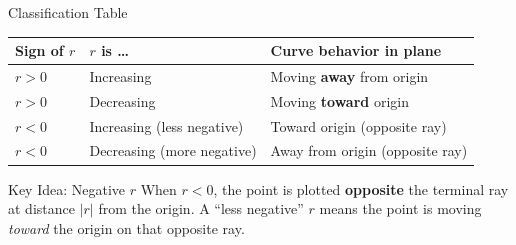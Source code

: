 \documentclass[aspectratio=169, 11pt]{beamer}
\begin{document}
\begin{frame}[t, plain]

  \begin{block}{Classification Table}
    \renewcommand{\arraystretch}{1.5}
    \begin{tabular}{|l|l|l|}
      \hline
      \textbf{Sign of $r$} & \textbf{$r$ is \ldots} & \textbf{Curve behavior in plane} \\
      \hline
      $r > 0$ & Increasing & Moving \textbf{away} from origin \\
      $r > 0$ & Decreasing & Moving \textbf{toward} origin \\
      $r < 0$ & Increasing (less negative) & Toward origin (opposite ray) \\
      $r < 0$ & Decreasing (more negative) & Away from origin (opposite ray) \\
      \hline
    \end{tabular}
  \end{block}

  \vspace{0.4cm}
  \begin{block}{Key Idea: Negative $r$}
    When $r < 0$, the point is plotted \textbf{opposite} the terminal ray at
    distance $|r|$ from the origin. A ``less negative'' $r$ means the point
    is moving \emph{toward} the origin on that opposite ray.
  \end{block}
\end{frame}
\end{document}
